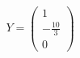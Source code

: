 \documentclass[preview]{standalone}
\begin{document}
\begin{align*}
Y = \begin{pmatrix} 1 \\ -\frac{10}{3} \\ 0 \end{pmatrix}
\end{align*}
\end{document}
